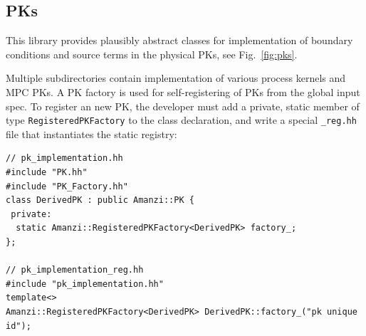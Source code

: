 \subsection{PKs}
This library provides plausibly abstract classes for implementation of 
boundary conditions and source terms in the physical PKs, see Fig.~\ref{fig:pks}.

Multiple subdirectories contain implementation of various process kernels and MPC PKs.
A PK factory is used for self-registering of PKs from the global input spec.
To register an new PK, the developer must add a private, static member of type 
{\tt RegisteredPKFactory} to the class declaration, and write a special {\tt \_reg.hh} 
file that instantiates the static registry:

\begin{lstlisting}
// pk_implementation.hh
#include "PK.hh"
#include "PK_Factory.hh"
class DerivedPK : public Amanzi::PK {
 private:
  static Amanzi::RegisteredPKFactory<DerivedPK> factory_;
};

// pk_implementation_reg.hh
#include "pk_implementation.hh"
template<>
Amanzi::RegisteredPKFactory<DerivedPK> DerivedPK::factory_("pk unique id");
\end{lstlisting}


